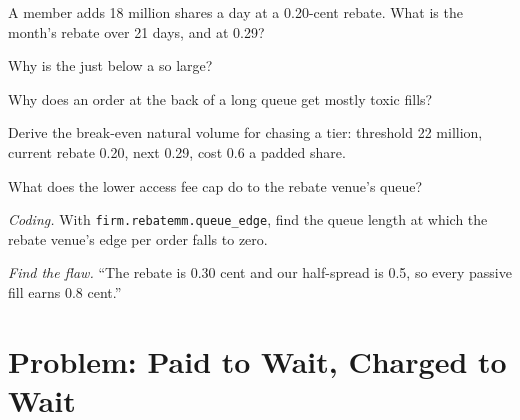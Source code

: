 \begin{exercise}[$\star$]\label{exo:hf:rebates-inverted-venues-and-tiers:2}
A member adds 18 million shares a day at a 0.20-cent rebate. What is the month's rebate over 21 days, and at 0.29?
\end{exercise}

\begin{exercise}[$\star$]\label{exo:hf:rebates-inverted-venues-and-tiers:3}
Why is the  just below a  so large?
\end{exercise}

\begin{exercise}[$\star\star$]\label{exo:hf:rebates-inverted-venues-and-tiers:4}
Why does an order at the back of a long queue get mostly toxic fills?
\end{exercise}

\begin{exercise}[$\star\star$]\label{exo:hf:rebates-inverted-venues-and-tiers:5}
Derive the break-even natural volume for chasing a tier: threshold 22 million, current rebate 0.20, next 0.29, cost 0.6 a padded share.
\end{exercise}

\begin{exercise}[$\star\star$]\label{exo:hf:rebates-inverted-venues-and-tiers:6}
What does the lower access fee cap do to the rebate venue's queue?
\end{exercise}

\begin{exercise}[$\star\star\star$]\label{exo:hf:rebates-inverted-venues-and-tiers:7}
\emph{Coding.} With \texttt{firm.rebatemm.queue\_edge}, find the queue length at which the rebate venue's edge per order falls to zero.
\end{exercise}

\begin{exercise}[$\star\star\star$]\label{exo:hf:rebates-inverted-venues-and-tiers:8}
\emph{Find the flaw.} ``The rebate is 0.30 cent and our half-spread is 0.5, so every passive fill earns 0.8 cent.''
\end{exercise}

\section{Problem: Paid to Wait, Charged to Wait}

